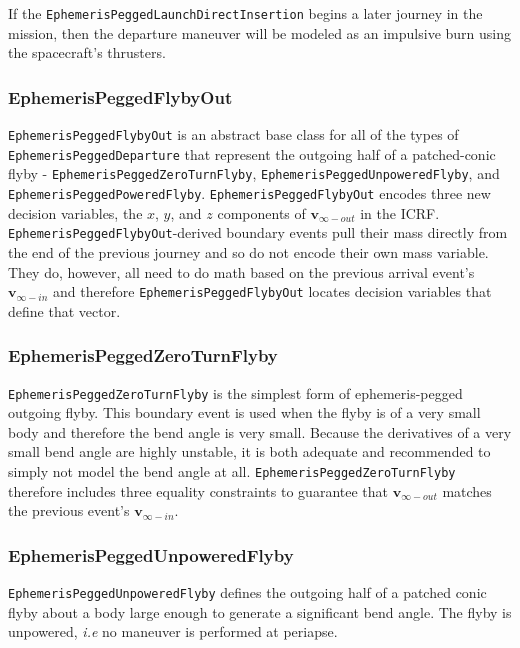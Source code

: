 If the \texttt{EphemerisPeggedLaunchDirectInsertion} begins a later journey in the mission, then the departure maneuver will be modeled as an impulsive burn using the spacecraft's thrusters.

\subsubsection{EphemerisPeggedFlybyOut}
\label{subsubsec:EphemerisPeggedFlybyOut}

\texttt{EphemerisPeggedFlybyOut} is an abstract base class for all of the types of \texttt{EphemerisPeggedDeparture} that represent the outgoing half of a patched-conic flyby - \texttt{EphemerisPeggedZeroTurnFlyby}, \texttt{EphemerisPeggedUnpoweredFlyby}, and \texttt{EphemerisPeggedPoweredFlyby}. \texttt{EphemerisPeggedFlybyOut} encodes three new decision variables, the $x$, $y$, and $z$ components of $\mathbf{v}_{\infty-out}$ in the \ac{ICRF}. 
\texttt{EphemerisPeggedFlybyOut}-derived boundary events pull their mass directly from the end of the previous journey and so do not encode their own mass variable. They do, however, all need to do math based on the previous arrival event's $\mathbf{v}_{\infty-in}$ and therefore \texttt{EphemerisPeggedFlybyOut} locates decision variables that define that vector.

\subsubsection{EphemerisPeggedZeroTurnFlyby}
\label{subsubsec:EphemerisPeggedZeroTurnFlyby}

\texttt{EphemerisPeggedZeroTurnFlyby} is the simplest form of ephemeris-pegged outgoing flyby. This boundary event is used when the flyby is of a very small body and therefore the bend angle is very small. Because the derivatives of a very small bend angle are highly unstable, it is both adequate and recommended to simply not model the bend angle at all. \texttt{EphemerisPeggedZeroTurnFlyby} therefore includes three equality constraints to guarantee that $\mathbf{v}_{\infty-out}$ matches the previous event's $\mathbf{v}_{\infty-in}$.

\subsubsection{EphemerisPeggedUnpoweredFlyby}
\label{subsubsec:EphemerisPeggedUnpoweredFlyby}

\texttt{EphemerisPeggedUnpoweredFlyby} defines the outgoing half of a patched conic flyby about a body large enough to generate a significant bend angle. The flyby is unpowered, \textit{i.e} no maneuver is performed at periapse.

